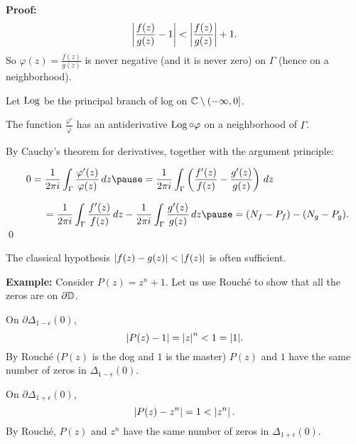 \documentclass[10pt,aspectratio=169]{beamer}
\begin{document}
\begin{frame}
\textbf{Proof:}
\begin{equation*}
\left\lvert {\frac{f(z)}{g(z)} - 1} \right\rvert <
\left\lvert {\frac{f(z)}{g(z)}} \right\rvert + 1 .
\end{equation*}
So
$\varphi(z) = \frac{f(z)}{g(z)}$ is never negative (and it is never zero) on
$\Gamma$ (hence on a neighborhood).

\pause
\medskip

Let $\operatorname{Log}$ be the principal branch of log on ${\mathbb{C}} \setminus (-\infty,0]$.

\pause
\medskip

The function
$\frac{\varphi'}{\varphi}$ has an antiderivative $\operatorname{Log} \circ \varphi$ on a neighborhood of $\Gamma$.

\pause
\medskip

By Cauchy's theorem for derivatives,
together with the argument principle:

\medskip

$
\displaystyle
\qquad
0
= \frac{1}{2\pi i} \int_{\Gamma} \frac{\varphi'(z)}{\varphi(z)} \, dz
\pause
=
\frac{1}{2\pi i} \int_{\Gamma}
\left( \frac{f'(z)}{f(z)} - \frac{g'(z)}{g(z)} \right) \, dz 
$

\medskip
\pause

$\displaystyle
\qquad\qquad
=
\frac{1}{2\pi i} \int_{\Gamma}
\frac{f'(z)}{f(z)} \, dz 
-
\frac{1}{2\pi i} \int_{\Gamma}
\frac{g'(z)}{g(z)} \, dz 
\pause
=
(N_f - P_f) - (N_g - P_g) .
\quad
$
\qed
\end{frame}

\begin{frame}
The classical hypothesis $\lvert {f(z)-g(z)} \rvert < \lvert {f(z)} \rvert$ is often
sufficient.

\medskip
\pause

\textbf{Example:}
Consider $P(z) = z^n + 1$.
Let us use Rouch\'e to show that all the zeros are on $\partial {\mathbb{D}}$.

\medskip
\pause

On $\partial \Delta_{1-\epsilon}(0)$,
\[
\left\lvert {P(z) - 1} \right\rvert = \left\lvert {z} \right\rvert^n < 1 = \lvert {1} \rvert.
\]
\pause
By Rouch\'e ($P(z)$ is the dog and $1$ is the master)
$P(z)$ and $1$ have the same number of zeros in 
$\Delta_{1-\epsilon}(0)$.

\medskip
\pause

On $\partial \Delta_{1+\epsilon}(0)$,
\begin{equation*}
\left\lvert {P(z) - z^n} \right\rvert = 1 < \left\lvert {z^n} \right\rvert .
\end{equation*}
By Rouch\'e,
$P(z)$ and $z^n$ have the same number of zeros in 
$\Delta_{1+\epsilon}(0)$.
\end{frame}
\end{document}
